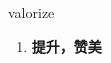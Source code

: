 
\begin{frame}
{\huge valorize}
\begin{center}
\begin{enumerate}\Large
  \item \textbf{提升，赞美}
\end{enumerate}
\end{center}
\end{frame}
